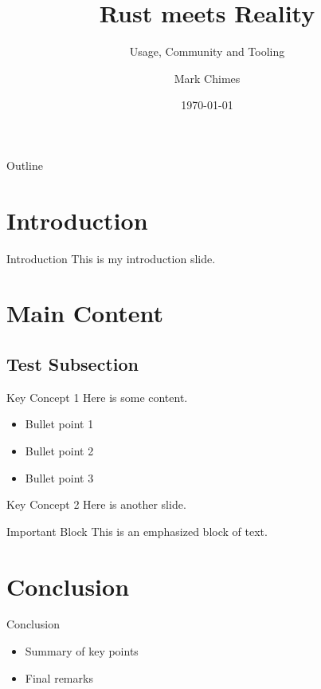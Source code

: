 \documentclass{beamer}
\title{Rust meets Reality}
\subtitle{Usage, Community and Tooling}
\author{Mark Chimes}
\date{\today}
\begin{document}
\begin{frame}
    \titlepage
\end{frame}

\begin{frame}{Outline}
    \tableofcontents
\end{frame}

\section{Introduction}

\begin{frame}{Introduction}
    This is my introduction slide.
\end{frame}

\section{Main Content}

\subsection{Test Subsection}
\begin{frame}{Key Concept 1}
    Here is some content.
    \begin{itemize}
        \item Bullet point 1
        \item Bullet point 2
        \item Bullet point 3
    \end{itemize}
\end{frame}

\begin{frame}{Key Concept 2}
    Here is another slide.
    \begin{block}{Important Block}
        This is an emphasized block of text.
    \end{block}
\end{frame}

\section{Conclusion}

\begin{frame}{Conclusion}
    \begin{itemize}
        \item Summary of key points
        \item Final remarks
    \end{itemize}
\end{frame}
\end{document}
